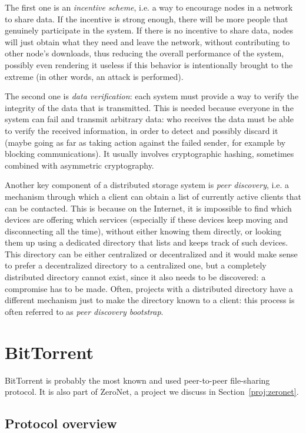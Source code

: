 \documentclass[mscthesis]{usiinfthesis}
\begin{document}
The first one is an \emph{incentive scheme}, i.e. a way to encourage nodes in a network to share data. If the incentive is strong enough, there will be more people that genuinely participate in the system. If there is no incentive to share data, nodes will just obtain what they need and leave the network, without contributing to other node's downloads, thus reducing the overall performance of the system, possibly even rendering it useless if this behavior is intentionally brought to the extreme (in other words, an attack is performed).

The second one is \emph{data verification}: each system must provide a way to verify the integrity of the data that is transmitted. This is needed because everyone in the system can fail and transmit arbitrary data: who receives the data must be able to verify the received information, in order to detect and possibly discard it (maybe going as far as taking action against the failed sender, for example by blocking communications). It usually involves cryptographic hashing, sometimes combined with asymmetric cryptography.

Another key component of a distributed storage system is \emph{peer discovery}, i.e. a mechanism through which a client can obtain a list of currently active clients that can be contacted. This is because on the Internet, it is impossible to find which devices are offering which services (especially if these devices keep moving and disconnecting all the time), without either knowing them directly, or looking them up using a dedicated directory that lists and keeps track of such devices. This directory can be either centralized or decentralized and it would make sense to prefer a decentralized directory to a centralized one, but a completely distributed directory cannot exist, since it also needs to be discovered: a compromise has to be made. Often, projects with a distributed directory have a different mechanism just to make the directory known to a client: this process is often referred to as \textit{peer discovery bootstrap}.

\section{BitTorrent}\label{proj:bittorrent}

BitTorrent is probably the most known and used peer-to-peer file-sharing protocol. It is also part of ZeroNet, a project we discuss in Section~\ref{proj:zeronet}.

\subsection{Protocol overview}
\end{document}
